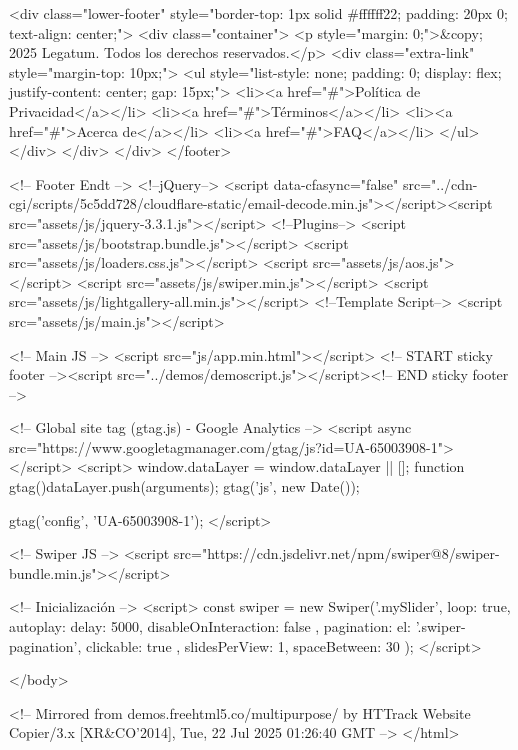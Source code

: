     <div class="lower-footer" style="border-top: 1px solid #ffffff22; padding: 20px 0; text-align: center;">
        <div class="container">
            <p style="margin: 0;">&copy; 2025 Legatum. Todos los derechos reservados.</p>
            <div class="extra-link" style="margin-top: 10px;">
                <ul style="list-style: none; padding: 0; display: flex; justify-content: center; gap: 15px;">
                    <li><a href="#">Política de Privacidad</a></li>
                    <li><a href="#">Términos</a></li>
                    <li><a href="#">Acerca de</a></li>
                    <li><a href="#">FAQ</a></li>
                </ul>
            </div>
        </div>
    </div>
</footer>

    <!-- Footer Endt -->
    <!--jQuery-->
    <script data-cfasync="false" src="../cdn-cgi/scripts/5c5dd728/cloudflare-static/email-decode.min.js"></script><script src="assets/js/jquery-3.3.1.js"></script>
    <!--Plugins-->
    <script src="assets/js/bootstrap.bundle.js"></script>
    <script src="assets/js/loaders.css.js"></script>
    <script src="assets/js/aos.js"></script>
    <script src="assets/js/swiper.min.js"></script>
    <script src="assets/js/lightgallery-all.min.js"></script>
    <!--Template Script-->
    <script src="assets/js/main.js"></script>

    <!-- Main JS -->
	<script src="js/app.min.html"></script>
	<!-- START sticky footer --><script src="../demos/demoscript.js"></script><!-- END sticky footer -->

<!-- Global site tag (gtag.js) - Google Analytics -->
<script async src="https://www.googletagmanager.com/gtag/js?id=UA-65003908-1"></script>
<script>
window.dataLayer = window.dataLayer || [];
function gtag(){dataLayer.push(arguments);}
gtag('js', new Date());

gtag('config', 'UA-65003908-1');
</script>


<!-- Swiper JS -->
<script src="https://cdn.jsdelivr.net/npm/swiper@8/swiper-bundle.min.js"></script>

<!-- Inicialización -->
<script>
  const swiper = new Swiper('.mySlider', {
    loop: true,
    autoplay: {
      delay: 5000,
      disableOnInteraction: false
    },
    pagination: {
      el: '.swiper-pagination',
      clickable: true
    },
    slidesPerView: 1,
    spaceBetween: 30
  });
</script>

</body>


<!-- Mirrored from demos.freehtml5.co/multipurpose/ by HTTrack Website Copier/3.x [XR&CO'2014], Tue, 22 Jul 2025 01:26:40 GMT -->
</html>